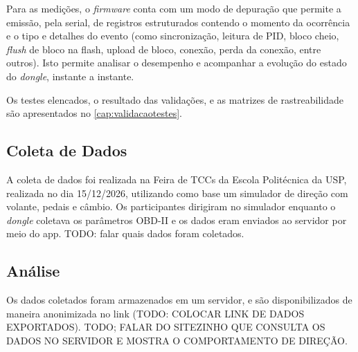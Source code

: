 Para as medições, o \textit{firmware} conta com um modo de depuração que permite a emissão, pela serial, de registros estruturados contendo o momento da ocorrência e o tipo e detalhes do evento (como sincronização, leitura de PID, bloco cheio, \textit{flush} de bloco na flash, upload de bloco, conexão, perda da conexão, entre outros). Isto permite analisar o desempenho e acompanhar a evolução do estado do \textit{dongle}, instante a instante. 

Os testes elencados, o resultado das validações, e as matrizes de rastreabilidade são apresentados no \autoref{cap:validacaotestes}.

\subsection{Coleta de Dados}

A coleta de dados foi realizada na Feira de TCCs da Escola Politécnica da USP, realizada no dia 15/12/2026, utilizando como base um simulador de direção com volante, pedais e câmbio. Os participantes dirigiram no simulador enquanto o \textit{dongle} coletava os parâmetros OBD-II e os dados eram enviados ao servidor por meio do app.  TODO: falar quais dados foram coletados.

\subsection{Análise}

Os dados coletados foram armazenados em um servidor, e são disponibilizados de maneira anonimizada no link (TODO: COLOCAR LINK DE DADOS EXPORTADOS). TODO; FALAR DO SITEZINHO QUE CONSULTA OS DADOS NO SERVIDOR E MOSTRA O COMPORTAMENTO DE DIREÇÃO.